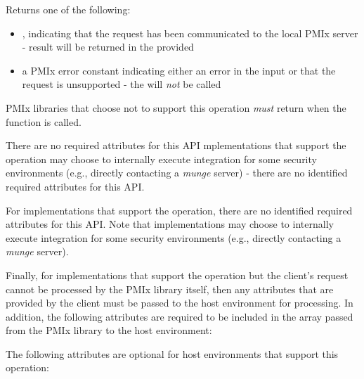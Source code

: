 \begin{arglist}
\end{arglist}

Returns one of the following:

\begin{itemize}
    \item {}, indicating that the request has been communicated to the local \ac{PMIx} server - result will be returned in the provided 
    \item a \ac{PMIx} error constant indicating either an error in the input or that the request is unsupported - the  will \textit{not} be called
\end{itemize}

\reqattrstart
\ac{PMIx} libraries that choose not to support this operation \textit{must} return  when the function is called.

There are no required attributes for this \ac{API} mplementations that support the operation may choose to internally execute integration for some security environments (e.g., directly contacting a \textit{munge} server) - there are no identified required attributes for this \ac{API}.

For implementations that support the operation, there are no identified required
attributes for this \ac{API}. Note that implementations may choose to internally
execute integration for some security environments (e.g., directly
contacting a \textit{munge} server).

Finally, for implementations that support the operation but the client's request
cannot be processed by the \ac{PMIx} library itself, then any attributes that are provided by the client must be passed to the host environment for processing. In addition, the following attributes are required to be included in the  array passed from the \ac{PMIx} library to the host environment:


\reqattrend

\optattrstart
The following attributes are optional for host environments that support this operation:

